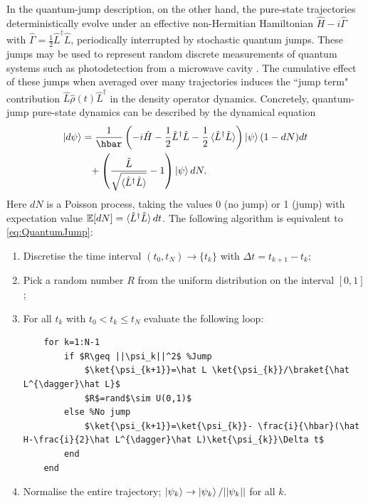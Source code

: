 \documentclass[12pt]{iopart} %
\begin{document}
In the quantum-jump description, on the other hand, the pure-state trajectories deterministically evolve under an effective non-Hermitian Hamiltonian $\hat H-i\hat \Gamma$ with $\hat\Gamma=\frac{1}{2}\hat L^{\dagger} \hat L$, periodically interrupted by stochastic quantum jumps. These jumps may be used to represent random discrete measurements of quantum systems such as photodetection from a microwave cavity \cite{wiseman1996quantum}. The cumulative effect of these jumps when averaged over many trajectories induces the ``jump term" contribution $ \hat{L} \hat{\rho}(t) \hat{L}^{\dagger}$ in the density operator dynamics. Concretely, quantum-jump pure-state dynamics can be described by the dynamical equation
\begin{equation} \label{eq:QuantumJump}
	\begin{aligned}
		\ket{d \psi } &= \frac{1}{\hbar}\left(-{i}\hat{H} -\frac{1}{2 }\hat{L}^{\dagger}\hat{L} - \frac{1}{2}\braket{\hat{L}^{\dagger}\hat{L}}\right)\ket {\psi}(1-dN) dt \\
		 &\phantom{=}+ \left(\frac{\hat{L}}{\sqrt{\braket{\hat{L}^{\dagger}\hat{L}}}}-1\right)\ket{\psi} dN.
	\end{aligned}
\end{equation} 
 Here $dN$ is a Poisson process, taking the values 0 (no jump) or 1 (jump) with expectation value $\mathbb{E}[dN]=\braket{\hat{L}^{\dagger}\hat{L}} dt$. The following algorithm  \cite{wisemanBook} is equivalent to \cref{eq:QuantumJump}:
 \begin{enumerate} 
	\item Discretise the time interval $(t_0,t_N) \rightarrow \{t_k \} $ with $\Delta t=t_{k+1}-t_k$;
	\item Pick a random number $R$ from the uniform distribution on the interval $[0,1]$;
	\item For all $t_k$ with $t_0< t_k\leq t_N$ evaluate the following loop:
    \begin{lstlisting}
    for k=1:N-1
        if $R\geq ||\psi_k||^2$ %Jump
            $\ket{\psi_{k+1}}=\hat L \ket{\psi_{k}}/\braket{\hat L^{\dagger}\hat L}$ 
            $R$=rand$\sim U(0,1)$
        else %No jump
            $\ket{\psi_{k+1}}=\ket{\psi_{k}}- \frac{i}{\hbar}(\hat H-\frac{i}{2}\hat L^{\dagger}\hat L)\ket{\psi_{k}}\Delta t$ 
        end
    end
    \end{lstlisting}
	\item Normalise the entire trajectory; $\ket{\psi_{k}}\rightarrow \ket{\psi_{k}}/||\psi_{k}||$ for all $k$.
\end{enumerate}
\end{document}
